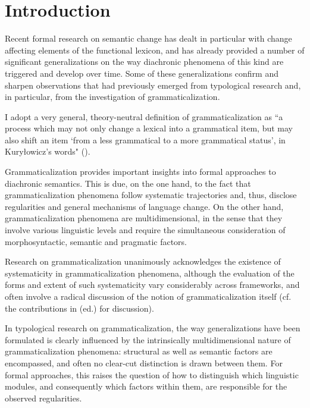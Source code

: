 \documentclass[output=paper,modfonts,nonflat,citecolor=brown,
showindex
]{langsci/langscibook}
\author{Chiara Gianollo\affiliation{Università di Bologna}}
\begin{document}
\maketitle
\section{Introduction}

Recent formal research on semantic change has dealt in particular with change affecting elements of the functional lexicon, and has already provided a number of significant generalizations on the way diachronic phenomena of this kind are triggered and develop over time. Some of these generalizations confirm and sharpen observations that had previously emerged from typological research and, in particular, from the investigation of grammaticalization. 

I adopt a very general, theory-neutral definition of grammaticalization as ``a process which may not only change a lexical into a grammatical item, but may also shift an item `from a less grammatical to a more grammatical status', in Kury\l{}owicz's words" (\citealt[13]{Lehmann15}).

Grammaticalization provides important insights into formal approaches to diachronic semantics. This is due, on the one hand, to the fact that grammaticalization phenomena follow systematic trajectories and, thus, disclose regularities and general mechanisms of language change. On the other hand, grammaticalization phenomena are multidimensional, in the sense that they involve various linguistic levels and require the simultaneous consideration of morphosyntactic, semantic and pragmatic factors.

Research on grammaticalization unanimously acknowledges the existence of systematicity in grammaticalization phenomena, although the evaluation of the forms and extent of such systematicity vary considerably across frameworks, and often involve a radical discussion of the notion of grammaticalization itself (cf. the contributions in \citealt{Campbell01} (ed.) for discussion).

In typological research on grammaticalization, the way generalizations have been formulated is clearly influenced by the intrinsically multidimensional nature of grammaticalization phenomena: structural as well as semantic factors are encompassed, and often no clear-cut distinction is drawn between them. For formal approaches, this raises the question of how to distinguish which linguistic modules, and consequently which factors within them, are responsible for the observed regularities. 
\end{document}
